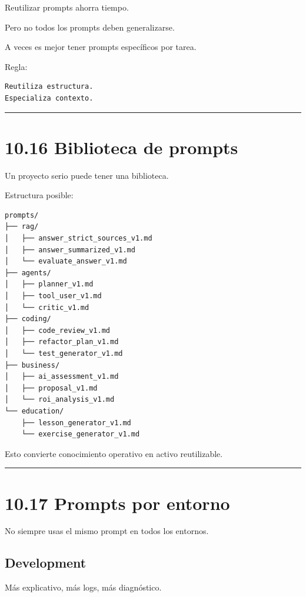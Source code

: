 Reutilizar prompts ahorra tiempo.

Pero no todos los prompts deben generalizarse.

A veces es mejor tener prompts específicos por tarea.

Regla:

\begin{lstlisting}
Reutiliza estructura.
Especializa contexto.
\end{lstlisting}

\begin{center}\rule{0.5\linewidth}{0.5pt}\end{center}

\section{10.16 Biblioteca de prompts}\label{biblioteca-de-prompts}

Un proyecto serio puede tener una biblioteca.

Estructura posible:

\begin{lstlisting}
prompts/
├── rag/
│   ├── answer_strict_sources_v1.md
│   ├── answer_summarized_v1.md
│   └── evaluate_answer_v1.md
├── agents/
│   ├── planner_v1.md
│   ├── tool_user_v1.md
│   └── critic_v1.md
├── coding/
│   ├── code_review_v1.md
│   ├── refactor_plan_v1.md
│   └── test_generator_v1.md
├── business/
│   ├── ai_assessment_v1.md
│   ├── proposal_v1.md
│   └── roi_analysis_v1.md
└── education/
    ├── lesson_generator_v1.md
    └── exercise_generator_v1.md
\end{lstlisting}

Esto convierte conocimiento operativo en activo reutilizable.

\begin{center}\rule{0.5\linewidth}{0.5pt}\end{center}

\section{10.17 Prompts por entorno}\label{prompts-por-entorno}

No siempre usas el mismo prompt en todos los entornos.

\subsection{Development}\label{development}

Más explicativo, más logs, más diagnóstico.

